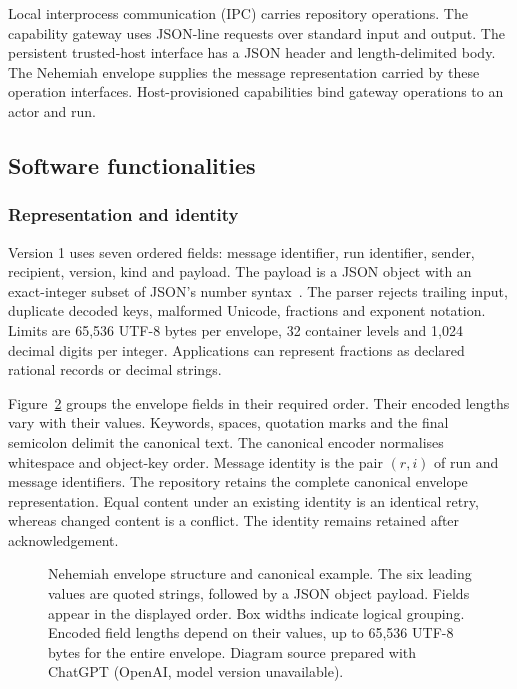 \documentclass[preprint,12pt,a4paper]{elsarticle}
\newcommand{\aifigure}{Diagram source prepared with ChatGPT (OpenAI, model version unavailable).}
\begin{document}
\begin{figure}[htbp]
\centering

\caption[Logical routes and local implementation]{\protect}\label{fig:architecture}
\end{figure}

Local interprocess communication (IPC) carries repository operations. The capability gateway uses JSON-line requests over standard input and output. The persistent trusted-host interface has a JSON header and length-delimited body. The Nehemiah envelope supplies the message representation carried by these operation interfaces. Host-provisioned capabilities bind gateway operations to an actor and run.

\subsection{Software functionalities}
\subsubsection{Representation and identity}
Version 1 uses seven ordered fields: message identifier, run identifier, sender, recipient, version, kind and payload. The payload is a JSON object with an exact-integer subset of JSON's number syntax~\citep{rfc8259}. The parser rejects trailing input, duplicate decoded keys, malformed Unicode, fractions and exponent notation. Limits are 65,536 UTF-8 bytes per envelope, 32 container levels and 1,024 decimal digits per integer. Applications can represent fractions as declared rational records or decimal strings.

Figure~\ref{fig:wire} groups the envelope fields in their required order. Their encoded lengths vary with their values. Keywords, spaces, quotation marks and the final semicolon delimit the canonical text. The canonical encoder normalises whitespace and object-key order. Message identity is the pair $(r,i)$ of run and message identifiers. The repository retains the complete canonical envelope representation. Equal content under an existing identity is an identical retry, whereas changed content is a conflict. The identity remains retained after acknowledgement.

\begin{figure}[htbp]
\centering

\caption{Nehemiah envelope structure and canonical example. The six leading values are quoted strings, followed by a JSON object payload. Fields appear in the displayed order. Box widths indicate logical grouping. Encoded field lengths depend on their values, up to 65,536 UTF-8 bytes for the entire envelope. \aifigure}\label{fig:wire}
\end{figure}
\end{document}
